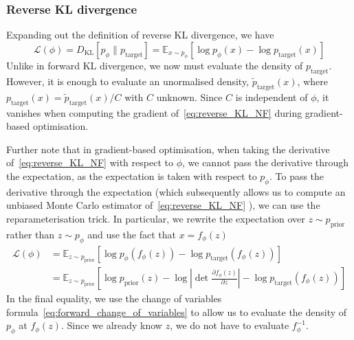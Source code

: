 \documentclass[12pt,a4paper]{report}
\begin{document}
\subsubsection{Reverse KL divergence}
Expanding out the definition of reverse KL divergence, we have
\begin{equation}
    \label{eq:reverse_KL_NF}
    \mathcal{L}(\phi) = D_{\mathrm{KL}} \left[ p_\phi \parallel p_{\text{target}} \right] = \mathbb{E}_{x \sim p_\phi} \left[ \log p_\phi(x) - \log p_{\text{target}}(x) \right] 
\end{equation}
Unlike in forward KL divergence, we now must evaluate the density of $p_{\text{target}}$. However, it is enough to evaluate an unormalised density, $\tilde{p}_{\text{target}}(x)$, where $p_{\text{target}}(x) = \tilde{p}_{\text{target}}(x) / C$ with $C$ unknown. Since $C$ is independent of $\phi$, it vanishes when computing the gradient of~\ref{eq:reverse_KL_NF} during gradient-based optimisation. 

Further note that in gradient-based optimisation, when taking the derivative of~\ref{eq:reverse_KL_NF} with respect to $\phi$, we cannot pass the derivative through the expectation, as the expectation is taken with respect to $p_\phi$. To pass the derivative through the expectation (which subsequently allows us to compute an unbiased Monte Carlo estimator of~\ref{eq:reverse_KL_NF} ), we can use the reparameterisation trick. In particular, we rewrite the expectation over $z \sim p_\text{prior} $ rather than $z \sim p_\phi$ and use the fact that $x = f_\phi(z)$
\begin{align}
     \mathcal{L}(\phi) &= \mathbb{E}_{z \sim p_{\text{prior}}} \left[ \log p_\phi(f_\phi(z))- \log {p}_{\text{target}}(f_\phi(z)) \right]  \nonumber \\
     &= \mathbb{E}_{z \sim p_{\text{prior}}} \left[ \log p_{\text{prior}}(z) - \log \left| \det \frac{\partial f_\phi(z)}{\partial z} \right| - \log {p}_{\text{target}}(f_\phi(z)) \right] \label{eq:reverse_KL_NF_reparam}
\end{align}
In the final equality, we use the change of variables formula~\ref{eq:forward_change_of_variables} to allow us to evaluate the density of $p_\phi$ at $f_\phi(z)$.  Since we already know $z$, we do not have to evaluate  $f_\phi^{-1}$. 

\end{document}
